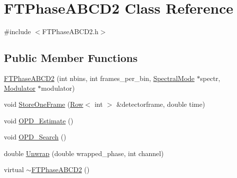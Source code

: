 \hypertarget{classFTPhaseABCD2}{
\section{FTPhaseABCD2 Class Reference}
\label{classFTPhaseABCD2}
}


{\ttfamily \#include $<$FTPhaseABCD2.h$>$}

\subsection*{Public Member Functions}
\begin{DoxyCompactItemize}
\item 
\hyperlink{classFTPhaseABCD2_ad221cbcea6aae7dc1ee5b781c17bba81}{FTPhaseABCD2} (int nbins, int frames\_\-per\_\-bin, \hyperlink{classSpectralMode}{SpectralMode} $\ast$spectr, \hyperlink{classModulator}{Modulator} $\ast$modulator)
\item 
void \hyperlink{classFTPhaseABCD2_ad4b0d7297334da3cb4454f90fd6cb09f}{StoreOneFrame} (\hyperlink{classRow}{Row}$<$ int $>$ \&detectorframe, double time)
\item 
void \hyperlink{classFTPhaseABCD2_a1f9794309bdfae8ea7c5f57682b89dbf}{OPD\_\-Estimate} ()
\item 
void \hyperlink{classFTPhaseABCD2_a23a931c7735b2c0809d05fb08c3ddf0e}{OPD\_\-Search} ()
\item 
double \hyperlink{classFTPhaseABCD2_a075b8f4137bbfcb352f6c97aa43d96c5}{Unwrap} (double wrapped\_\-phase, int channel)
\item 
virtual \hyperlink{classFTPhaseABCD2_aa873d8d953ee9ae65b02962ee59c3705}{$\sim$FTPhaseABCD2} ()
\end{DoxyCompactItemize}
